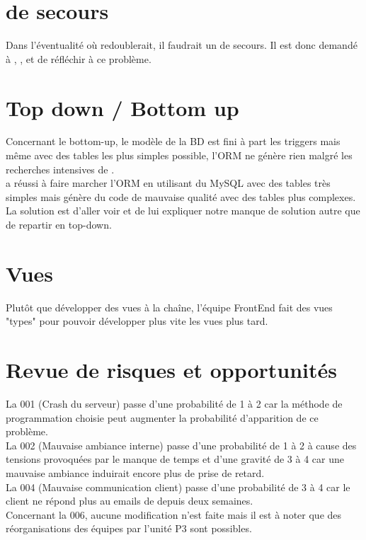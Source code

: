 \documentclass [a4paper] {article}
\begin{document}
\section{\CP{} de secours}
Dans l'éventualité où \Pierre{} redoublerait, il faudrait un \CP{} de secours. Il est donc demandé à \Florian, \Melissa, \Matthieu{} et \Julie{} de réfléchir à ce problème.


\section{Top down / Bottom up}
Concernant le bottom-up, le modèle de la BD est fini à part les triggers mais même avec des tables les plus simples possible, l'ORM ne génère rien malgré les recherches intensives de \Michel. \\
\Kafui a réussi à faire marcher l'ORM en utilisant du MySQL avec des tables très simples mais génère du code de mauvaise qualité avec des tables plus complexes. \\
La solution est d'aller voir \nomTuteurPedago{} et de lui expliquer notre manque de solution autre que de repartir en top-down.


\section{Vues}
Plutôt que développer des vues à la chaîne, l'équipe FrontEnd fait des vues "types" pour pouvoir développer plus vite les vues plus tard. 


\section{Revue de risques et opportunités}

La \FDR{} 001 (Crash du serveur) passe d'une probabilité de 1 à 2 car la méthode de programmation choisie peut augmenter la probabilité d'apparition de ce problème. \\

La \FDR{} 002 (Mauvaise ambiance interne) passe d'une probabilité de 1 à 2 à cause des tensions provoquées par le manque de temps et d'une gravité de 3 à 4 car une mauvaise ambiance induirait encore plus de prise de retard.\\

La \FDR{} 004 (Mauvaise communication client) passe d'une probabilité de 3 à 4 car le client ne répond plus au emails de \Sergi{} depuis deux semaines.\\

Concernant la \FDR{} 006, aucune modification n'est faite mais il est à noter que des réorganisations des équipes par l'unité P3 sont possibles.\\
\end{document}

